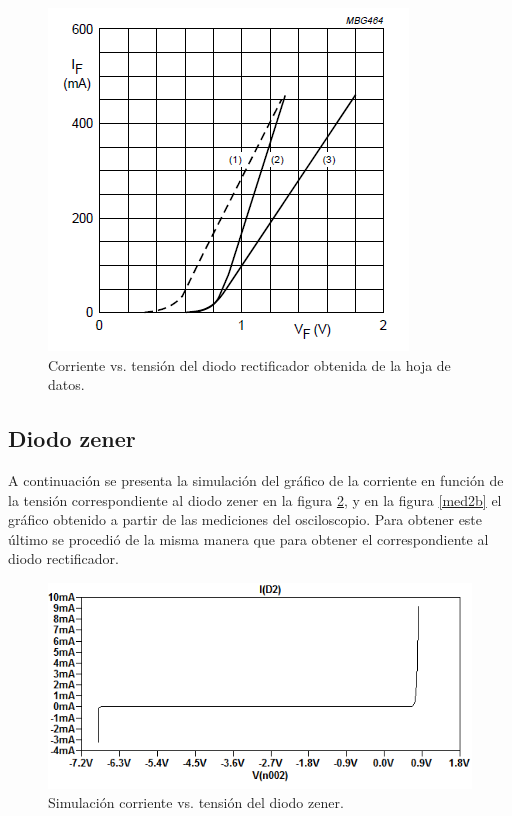 \begin{figure}[H]
\centering
\includegraphics[scale=0.52]{../EJ1/DiodoRectificador/corrienteDiodoDatasheet}
\caption{Corriente vs. tensi\'on del diodo rectificador obtenida de la hoja de datos.}
\label{med1c}
\end{figure}

\subsection*{\color{orange}Diodo zener}

A continuaci\'on se presenta la simulaci\'on del gr\'afico de la corriente en funci\'on de la tensi\'on correspondiente al diodo zener en la figura \ref{med2a}, y en la figura \ref{med2b} el gr\'afico obtenido a partir de las mediciones del osciloscopio. Para obtener este \'ultimo se procedi\'o de la misma manera que para obtener el correspondiente al diodo rectificador.

\begin{figure}[H]
\centering
\includegraphics[scale=0.62]{../EJ1/DiodoZener/simulacionZener}
\caption{Simulaci\'on corriente vs. tensi\'on del diodo zener.}
\label{med2a}
\end{figure}

